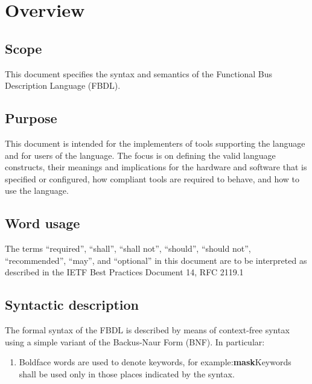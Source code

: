 \chapter{Overview}

\section{Scope}

This document specifies the syntax and semantics of the Functional Bus Description Language (FBDL).

\section{Purpose}

This document is intended for the implementers of tools supporting the language and for users of the language.
The focus is on defining the valid language constructs, their meanings and implications for the hardware and software that is specified or configured, how compliant tools are required to behave, and how to use the language.

\section{Word usage}

The terms “required”, “shall”, “shall not”, “should”, “should not”, “recommended”, “may”, and “optional” in this document are to be interpreted as described in the IETF Best Practices Document 14, RFC 2119.1

\section{Syntactic description}

The formal syntax of the FBDL is described by means of context-free syntax using a simple variant of the Backus-Naur Form (BNF).
In particular:
\begin{enumerate}[label=\alph*)]
	\item Boldface words are used to denote keywords, for example:\newline \textbf{mask}\newline Keywords shall be used only in those places indicated by the syntax.
\end{enumerate}
